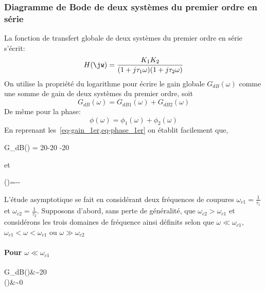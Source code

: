 \subsubsection*{Diagramme de Bode de deux systèmes du premier ordre en série }
La fonction de transfert globale de deux systèmes du premier ordre en série 
s'écrit:
\begin{align}
    H(\jw)=\dfrac{K_1K_2}{(1+j\tau_1\omega)(1+j\tau_2\omega)}
    \label{eq-1er_serie}
\end{align}
On utilise la propriété du logarithme pour écrire le gain globale 
$G_{dB}(\omega)$ comme une somme de gain de deux systèmes du premier ordre, 
soit
\[
G_{dB}(\omega) = G_{dB1}(\omega) + G_{dB2}(\omega)
\]
De même pour la phase:
\[
\phi(\omega)= \phi_1(\omega) + \phi_2(\omega)
\]
En reprenant les~\cref{eq-gain_1er,eq-phase_1er} on établit facilement que,
\begin{bequation}
    G_{dB}(\omega) = 20-20
                    -20
\end{bequation}
et
\begin{bequation}
    \phi(\omega)=-\arctan{\tau_1\omega}-\arctan{\tau_2\omega}
\end{bequation}
L'étude asymptotique se fait en considérant deux fréquences de coupures 
$\omega_{c1}=\frac{1}{\tau_1}$ et $\omega_{c2}=\frac{1}{\tau_2}$.
Supposons d'abord, sans perte de généralité, que $\omega_{c2}>\omega_{c1}$ et 
considérons 
les trois domaines de fréquence ainsi définits selon que 
$\omega\ll\omega_{c1}$, $\omega_{c1}<\omega<\omega_{c1}$ ou 
$\omega\gg\omega_{c2}$
\paragraph{Pour $\omega\ll\omega_{c1}$}
\begin{bequation}
    G_{dB}(\omega)&\sim20\\
      \phi(\omega)&\sim0\degreeSI
\end{bequation}
